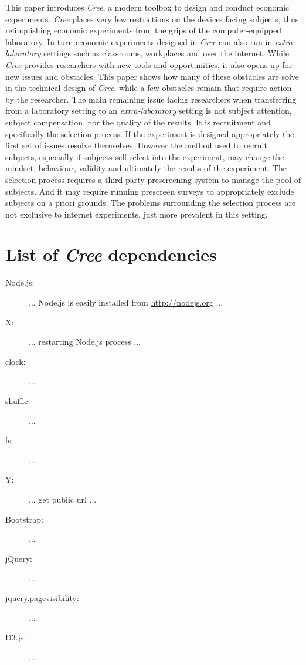 \documentclass[preprint, 12pt]{elsarticle}
\newcommand{\Cree}{\emph{Cree}\xspace}
\begin{document}
This paper introduces \Cree, a modern toolbox to design and conduct economic experiments. \Cree places very few restrictions on the devices facing subjects, thus relinquishing economic experiments from the grips of the computer-equipped laboratory. In turn economic experiments designed in \Cree can also run in \emph{extra-laboratory} settings such as classrooms, workplaces and over the internet. While \Cree provides researchers with new tools and opportunities, it also opens up for new issues and obstacles. This paper shows how many of these obstacles are solve in the technical design of \Cree, while a few obstacles remain that require action by the researcher. The main remaining issue facing researchers when transferring from a laboratory setting to an \emph{extra-laboratory} setting is not subject attention, subject compensation, nor the quality of the results. It is recruitment and specifically the selection process. If the experiment is designed appropriately the first set of issues resolve themselves. However the method used to recruit subjects, especially if subjects self-select into the experiment, may change the mindset, behaviour, validity and ultimately the results of the experiment. The selection process requires a third-party prescreening system to manage the pool of subjects. And it may require running prescreen surveys to appropriately exclude subjects on a priori grounds. The problems surrounding the selection process are not exclusive to internet experiments, just more prevalent in this setting.

\newpage

\appendix

\section{List of \Cree dependencies}

\begin{description}
  \item[Node.js:] ... Node.js is easily installed from \url{http://nodejs.org} ...
  \item[{\color{red} X:}] ... restarting Node.js process ...
  \item[clock:] ...
  \item[shuffle:] ...
  \item[fs:] ...
  \item[{\color{red} Y:}] ... get public url ...
  \item[Bootstrap:] ...
  \item[jQuery:] ...
  \item[{\color{red} jquery.pagevisibility:}] ...
  \item[D3.js:] ...
\end{description}

\newpage


\raggedright
\singlespacing

\end{document}
